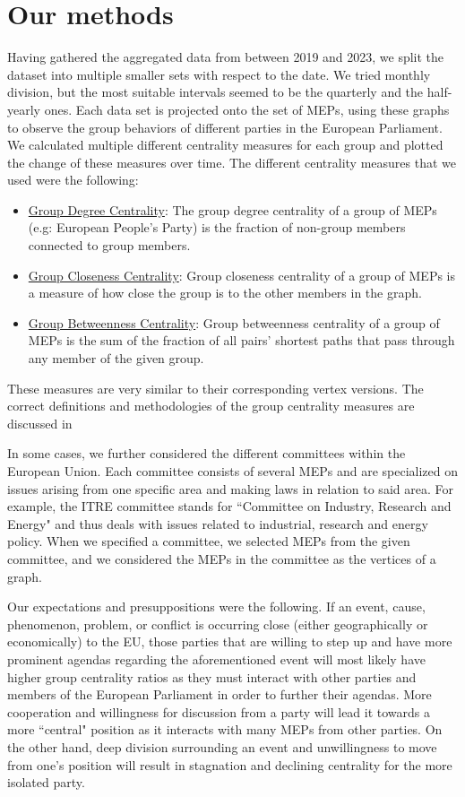 \documentclass[lettersize,journal]{IEEEtran}
\begin{document}
\section{Our methods} \label{sec:method}

Having gathered the aggregated data from between 2019 and 2023, we split the dataset into multiple smaller sets with respect to the date. We tried monthly division, but the most suitable intervals seemed to be the quarterly and the half-yearly ones. Each data set is projected onto the set of  MEPs, using these graphs to observe the group behaviors of different parties in the European Parliament. We calculated multiple different centrality measures for each group and plotted the change of these measures over time. The different centrality measures that we used were the following:

\begin{itemize}
\item \underline{Group Degree Centrality}: The group degree centrality of a group of MEPs (e.g: European People's Party) is the fraction of non-group members connected to group members.
\item \underline{Group Closeness Centrality}: Group closeness centrality of a group of MEPs is a measure of how close the group is to the other members in the graph.
\item \underline{Group Betweenness Centrality}: Group betweenness centrality of a group of MEPs is the sum of the fraction of all pairs' shortest paths that pass through any member of the given group.
\end{itemize}

These measures are very similar to their corresponding vertex versions. The correct definitions and methodologies of the group centrality measures are discussed in \cite{Centralities}

In some cases, we further considered the different committees within the European Union. Each committee consists of several MEPs and are specialized on issues arising from one specific area and making laws in relation to said area. For example, the ITRE committee stands for ``Committee on Industry, Research and Energy" and thus deals with issues related to industrial, research and energy policy. When we specified a committee, we selected MEPs from the given committee, and we considered the MEPs in the committee as the vertices of a graph.

Our expectations and presuppositions were the following. If an event, cause, phenomenon, problem, or conflict is occurring close (either geographically or economically) to the EU, those parties that are willing to step up and have more prominent agendas regarding the aforementioned event will most likely have higher group centrality ratios as they must interact with other parties and members of the European Parliament in order to further their agendas. More cooperation and willingness for discussion from a party will lead it towards a more ``central" position as it interacts with many MEPs from other parties. On the other hand, deep division surrounding an event and unwillingness to move from one's position will result in stagnation and declining centrality for the more isolated party.
\end{document}
